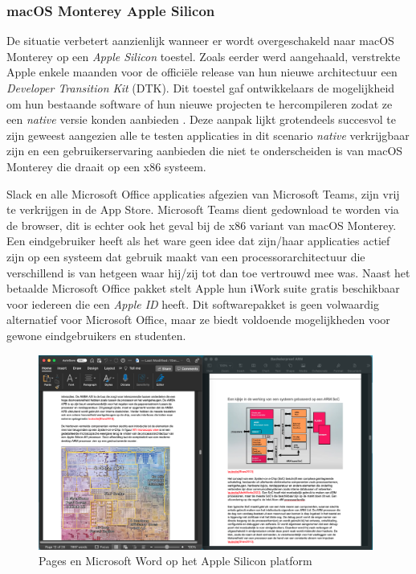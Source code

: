 \subsubsection{macOS Monterey Apple Silicon}
De situatie verbetert aanzienlijk wanneer er wordt overgeschakeld naar macOS Monterey op een \textit{Apple Silicon} toestel. Zoals eerder werd aangehaald, verstrekte Apple enkele maanden voor de officiële release van hun nieuwe architectuur een \textit{Developer Transition Kit} (DTK). Dit toestel gaf ontwikkelaars de mogelijkheid om hun bestaande software of hun nieuwe projecten te hercompileren zodat ze een \textit{native} versie konden aanbieden \autocite{Apple2020}. Deze aanpak lijkt grotendeels succesvol te zijn geweest aangezien alle te testen applicaties in dit scenario \textit{native} verkrijgbaar zijn en een gebruikerservaring aanbieden die niet te onderscheiden is van macOS Monterey die draait op een x86 systeem.

Slack en alle Microsoft Office applicaties afgezien van Microsoft Teams, zijn vrij te verkrijgen in de App Store. Microsoft Teams dient gedownload te worden via de browser, dit is echter ook het geval bij de x86 variant van macOS Monterey. Een eindgebruiker heeft als het ware geen idee dat zijn/haar applicaties actief zijn op een systeem dat gebruik maakt van een processorarchitectuur die verschillend is van hetgeen waar hij/zij tot dan toe vertrouwd mee was. Naast het betaalde Microsoft Office pakket stelt Apple hun iWork suite gratis beschikbaar voor iedereen die een \textit{Apple ID} heeft. Dit softwarepakket is geen volwaardig alternatief voor Microsoft Office, maar ze biedt voldoende mogelijkheden voor gewone eindgebruikers en studenten.

\begin{figure}[!h]
	\centering
	\includegraphics[width=110mm, scale=0.7]{img/office_macOSM1.png}
	\caption{Pages en Microsoft Word op het Apple Silicon platform}
\end{figure}

